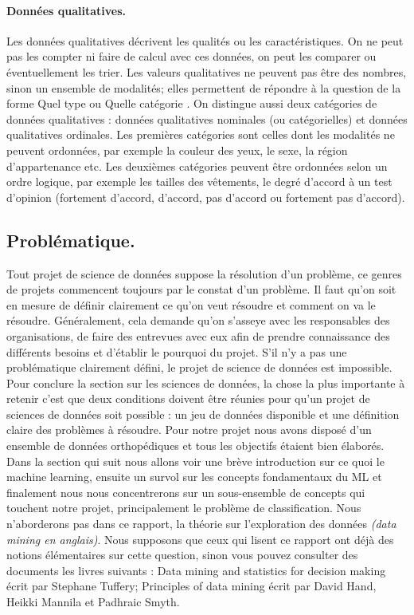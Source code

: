 \documentclass[12pt, french]{report}
\begin{document}
\paragraph{Données qualitatives.} 
Les données qualitatives décrivent les qualités ou les caractéristiques. On ne peut pas les compter ni faire de calcul avec ces données, on peut les comparer ou éventuellement les trier. Les valeurs qualitatives ne peuvent pas être des nombres, sinon un ensemble de modalités; elles permettent de répondre à la question de la forme \guillemotleft Quel type \guillemotright ou \guillemotleft Quelle catégorie \guillemotright. On distingue aussi deux catégories de données qualitatives : données qualitatives nominales (ou catégorielles) et données qualitatives ordinales. Les premières catégories sont celles dont les modalités ne peuvent ordonnées, par exemple la couleur des yeux, le sexe, la région d'appartenance etc. Les deuxièmes catégories peuvent être ordonnées selon un ordre logique, par exemple les tailles des vêtements, le degré d'accord à un test d'opinion (fortement d'accord, d'accord, pas d'accord ou fortement pas d'accord). \cite[p.~12]{key44}

\subsection{Problématique.}
Tout projet de science de données suppose la résolution d'un problème, ce genres de projets commencent toujours par le constat d'un problème. Il faut qu'on soit en mesure de définir clairement ce qu'on veut résoudre et comment on va le résoudre. Généralement, cela demande qu'on s'asseye avec les responsables des organisations, de faire des entrevues avec eux afin de prendre connaissance des différents besoins et d'établir le pourquoi du projet. S'il n'y a pas une problématique clairement défini, le projet de science de données est impossible. \\

Pour conclure la section sur les sciences de données, la chose la plus importante à retenir c'est que deux conditions doivent être réunies pour qu'un projet de sciences de données soit possible : un jeu de données disponible et une définition claire des problèmes à résoudre. Pour notre projet nous avons disposé d'un ensemble de données orthopédiques et tous les objectifs étaient bien élaborés. \\

Dans la section qui suit nous allons voir une brève introduction sur ce quoi le machine learning, ensuite un survol sur les concepts fondamentaux du ML et finalement nous nous concentrerons sur un sous-ensemble de concepts qui touchent notre projet, principalement le problème de classification. Nous n'aborderons pas dans ce rapport, la théorie sur l'exploration des données \textit{(data mining en anglais)}. Nous supposons que ceux qui lisent ce rapport ont déjà des notions élémentaires sur cette question, sinon vous pouvez consulter des documents les livres suivants : \guillemotleft Data mining and statistics for decision making \guillemotright écrit par Stephane Tuffery; \guillemotleft Principles of data mining \guillemotright  écrit par David Hand, Heikki Mannila et Padhraic Smyth.
\end{document}
